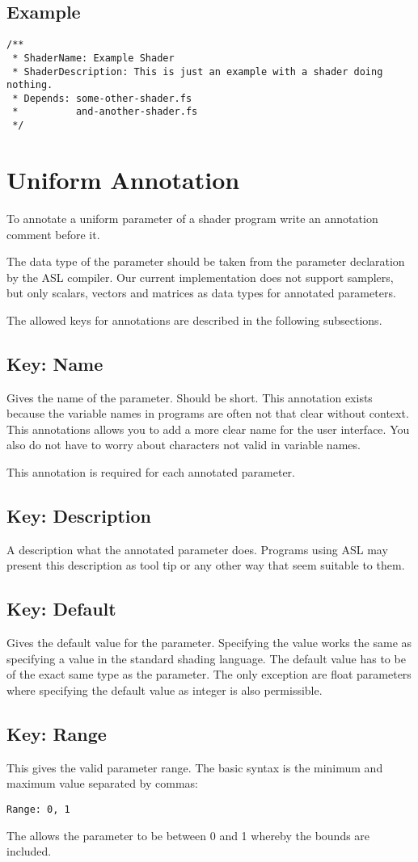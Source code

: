 \documentclass[11pt,a4paper]{scrreprt}
\newcommand{\key}[1]{\subsection{Key: #1}}
\begin{document}
\subsection{Example}
\begin{lstlisting}
/**
 * ShaderName: Example Shader
 * ShaderDescription: This is just an example with a shader doing nothing.
 * Depends: some-other-shader.fs
 *          and-another-shader.fs
 */
\end{lstlisting}

\section{Uniform Annotation}
To annotate a uniform parameter of a shader program write an annotation comment 
before it.

The data type of the parameter should be taken from the parameter declaration by 
the ASL compiler. Our current implementation does not support samplers, but only 
scalars, vectors and matrices as data types for annotated parameters.

The allowed keys for annotations are described in the following subsections.

\key{Name}
Gives the name of the parameter. Should be short. This annotation exists because 
the variable names in programs are often not that clear without context. This 
annotations allows you to add a more clear name for the user interface. You also 
do not have to worry about characters not valid in variable names.

This annotation is required for each annotated parameter.

\key{Description}
A description what the annotated parameter does. Programs using ASL may present 
this description as tool tip or any other way that seem suitable to them.

\key{Default}
Gives the default value for the parameter. Specifying the value works the same 
as specifying a value in the standard shading language. The default value has to 
be of the exact same type as the parameter. The only exception are float 
parameters where specifying the default value as integer is also permissible.

\key{Range}
This gives the valid parameter range. The basic syntax is the minimum and 
maximum value separated by commas:
\begin{lstlisting}
Range: 0, 1
\end{lstlisting}
The allows the parameter to be between 0 and 1 whereby the bounds are included.
\end{document}
